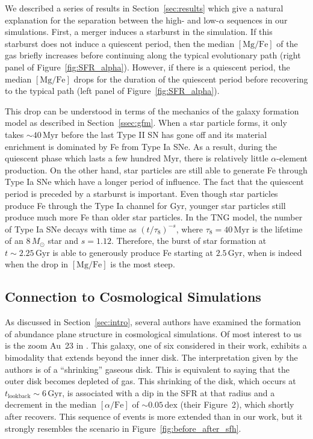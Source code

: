 \documentclass[linenumbers, twocolumn]{aastex631}
\newcommand{\Msun}{\ensuremath{M_{\odot}}}
\newcommand{\Gyr}{\ensuremath{\textrm{Gyr}}}
\newcommand{\Myr}{\ensuremath{\textrm{Myr}}}
\newcommand{\MgFe}{\ensuremath{[\textrm{Mg}/\textrm{Fe}]}}
\newcommand{\alphaFe}{\ensuremath{[\alpha/\textrm{Fe}]}}
\newcommand{\dex}{\ensuremath{\textrm{dex}}}
\begin{document}
We described a series of results in Section~\ref{sec:results} which give a natural explanation for the separation between the high- and low-$\alpha$ sequences in our simulations. First, a merger induces a starburst in the simulation. If this starburst does not induce a quiescent period, then the median \MgFe{} of the gas briefly increases before continuing along the typical evolutionary path (right panel of Figure~\ref{fig:SFR_alpha}). However, if there is a quiescent period, the median \MgFe{} drops for the duration of the quiescent period before recovering to the typical path (left panel of Figure~\ref{fig:SFR_alpha}).

This drop can be understood in terms of the mechanics of the galaxy formation model as described in Section~\ref{ssec:gfm}. When a star particle forms, it only takes $\sim40\,\Myr$ before the last Type II SN has gone off and its material enrichment is dominated by Fe from Type Ia SNe. As a result, during the quiescent phase which lasts a few hundred Myr, there is relatively little $\alpha$-element production. On the other hand, star particles are still able to generate Fe through Type Ia SNe which have a longer period of influence. The fact that the quiescent period is preceded by a starburst is important. Even though star particles produce Fe through the Type Ia channel for Gyr, younger star particles still produce much more Fe than older star particles. In the TNG model, the number of Type Ia SNe decays with time as $(t/\tau_8)^{-s}$, where $\tau_8=40\,\Myr$ is the lifetime of an $8\,\Msun$ star and $s=1.12$. Therefore, the burst of star formation at $t\sim2.25\,\Gyr$ is able to generously produce Fe starting at $2.5\,\Gyr$, when is indeed when the drop in \MgFe{} is the most steep.

\subsection{Connection to Cosmological Simulations}\label{ssec:cosmo}
As discussed in Section~\ref{sec:intro}, several authors have examined the formation of abundance plane structure in cosmological simulations. Of most interest to us is the zoom Au~23 in \citet{2018MNRAS.474.3629G}. This galaxy, one of six considered in their work, exhibits a bimodality that extends beyond the inner disk. The interpretation given by the authors is of a ``shrinking'' gaseous disk. This is equivalent to saying that the outer disk becomes depleted of gas. This shrinking of the disk, which occurs at $t_{\textrm{lookback}}\sim6\,\Gyr$, is associated with a dip in the SFR at that radius and a decrement in the median \alphaFe{} of $\sim0.05\,\dex$ (their Figure~2), which shortly after recovers. This sequence of events is more extended than in our work, but it strongly resembles the scenario in Figure~\ref{fig:before_after_sfh}.
\end{document}
